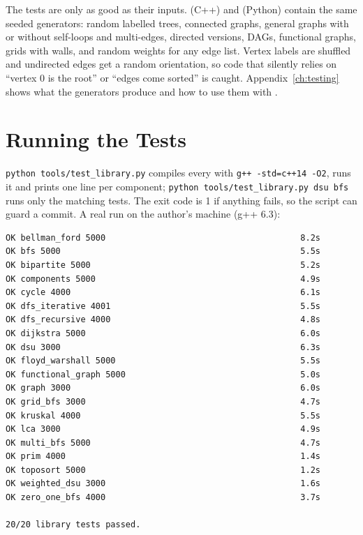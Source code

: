 The tests are only as good as their inputs.  (C++) and  (Python) contain the same seeded generators: random labelled trees, connected graphs, general graphs with or without self-loops and multi-edges, directed versions, DAGs, functional graphs, grids with walls, and random weights for any edge list. Vertex labels are shuffled and undirected edges get a random orientation, so code that silently relies on ``vertex 0 is the root'' or ``edges come sorted'' is caught. Appendix~\ref{ch:testing} shows what the generators produce and how to use them with .



\clneed
\section{Running the Tests}
\label{sec:cl-run}

\texttt{python tools/test\_library.py} compiles every  with \texttt{g++ -std=c++14 -O2}, runs it and prints one line per component; \texttt{python tools/test\_library.py dsu bfs} runs only the matching tests. The exit code is 1 if anything fails, so the script can guard a commit. A real run on the author's machine (g++ 6.3):

\begin{lstlisting}[style=trace]
OK bellman_ford 5000                                       8.2s
OK bfs 5000                                                5.5s
OK bipartite 5000                                          5.2s
OK components 5000                                         4.9s
OK cycle 4000                                              6.1s
OK dfs_iterative 4001                                      5.5s
OK dfs_recursive 4000                                      4.8s
OK dijkstra 5000                                           6.0s
OK dsu 3000                                                6.3s
OK floyd_warshall 5000                                     5.5s
OK functional_graph 5000                                   5.0s
OK graph 3000                                              6.0s
OK grid_bfs 3000                                           4.7s
OK kruskal 4000                                            5.5s
OK lca 3000                                                4.9s
OK multi_bfs 5000                                          4.7s
OK prim 4000                                               1.4s
OK toposort 5000                                           1.2s
OK weighted_dsu 3000                                       1.6s
OK zero_one_bfs 4000                                       3.7s

20/20 library tests passed.
\end{lstlisting}

